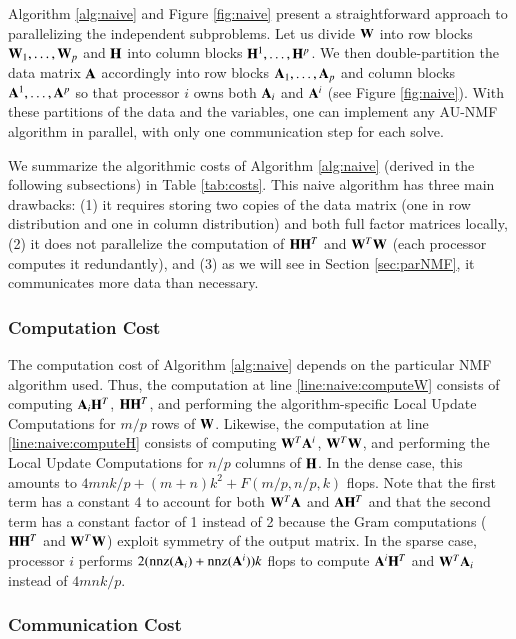Algorithm \ref{alg:naive} and Figure \ref{fig:naive} present a straightforward approach to parallelizing the independent subproblems.
Let us divide $\WW$ into row blocks $\WW_1, \ldots, \WW_p$ and $\HH$ into column blocks $\HH^1, \ldots, \HH^p$. 
We then double-partition the data matrix $\AA$ accordingly into row blocks $\AA_{1}, \ldots, \AA_p$ and column blocks $\AA^1, \ldots, \AA^p$ so that processor $i$ owns both $\AA_i$ and $\AA^i$ (see Figure \ref{fig:naive}).
With these partitions of the data and the variables, one can implement any AU-NMF algorithm in parallel, with only one communication step for each solve.

We summarize the algorithmic costs of Algorithm \ref{alg:naive} (derived in the following subsections) in Table \ref{tab:costs}.
This naive algorithm \cite{Fairbanks2015} has three main drawbacks: (1) it requires storing two copies of the data matrix (one in row distribution and one in column distribution) and both full factor matrices locally, (2) it does not parallelize the computation of $\HH\HH^T$ and $\WW^T\WW$ (each processor computes it redundantly), and (3) as we will see in Section \ref{sec:parNMF}, it communicates more data than necessary.

\subsubsection{Computation Cost}

The computation cost of Algorithm \ref{alg:naive} depends on the particular NMF algorithm used.
Thus, the computation at line \ref{line:naive:computeW} consists of computing $\AA_i\HH^T$, $\HH\HH^T$, and performing the algorithm-specific Local Update Computations for $m/p$ rows of $\WW$.
Likewise, the computation at line \ref{line:naive:computeH} consists of computing $\WW^T\AA^i$, $\WW^T\WW$, and performing the Local Update Computations for $n/p$ columns of $\HH$.
In the dense case, this amounts to $4mnk/p+(m+n)k^2+F(m/p,n/p,k)$ flops. 
Note that the first term has a constant 4 to account for both $\WW^T\AA$ and $\AA\HH^T$ and that the second term has a constant factor of 1 instead of 2 because the Gram computations ($\HH \HH^T$ and $\WW^T \WW$) exploit symmetry of the output matrix.
In the sparse case, processor $i$ performs $2(\nnz(\AA_i)+\nnz(\AA^i))k$ flops to compute $\AA^i\HH^T$ and $\WW^T\AA_i$ instead of $4mnk/p$. 

\subsubsection{Communication Cost}

